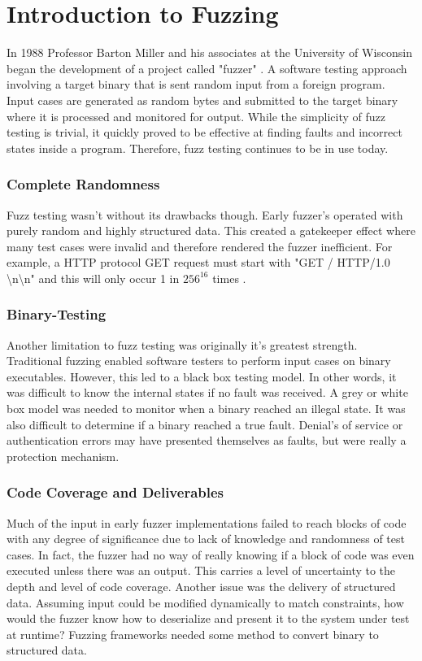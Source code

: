 \chapter{Introduction to Fuzzing}

In 1988 Professor Barton Miller and his associates at the University of Wisconsin began the development of a project called "fuzzer" \cite{mil-fuzz}. A software testing approach involving a target binary that is sent random input from a foreign program.
 Input cases are generated as random bytes and submitted to the target binary where it is processed and monitored for output. While the simplicity of fuzz testing is trivial, it quickly proved to be effective at finding faults and incorrect states inside a program. 
Therefore, fuzz testing continues to be in use today.

\subsection{Complete Randomness}
Fuzz testing wasn't without its drawbacks though. Early fuzzer's operated with purely random and highly structured data.
This created a gatekeeper effect where many test cases were invalid and therefore rendered the fuzzer inefficient. 
For example, a HTTP protocol GET request  must start with "GET / HTTP/1.0 \textbackslash n\textbackslash n" and this will only occur 1 in $256^{16}$ times \cite{mil-fuzz}. 

\subsection{Binary-Testing}
Another limitation to fuzz testing was originally it's greatest strength. Traditional fuzzing enabled software testers to perform input cases on binary executables. 
However, this led to a black box testing model. In other words, it was difficult to know the internal states if no fault was received.  A grey or white box model was needed to monitor when a binary reached an illegal state.  It was also difficult to determine
if a binary reached a true fault. Denial's of service or authentication errors may have presented themselves as faults, but were really a protection mechanism.

\subsection{Code Coverage and Deliverables}
Much of the input in early fuzzer implementations failed to reach blocks of code with any degree of significance due to lack of knowledge and randomness of test cases. In fact, the fuzzer had no way of really knowing if a block of code was even executed
unless there was an output. This carries a level of uncertainty to the depth and level of code coverage.  Another issue was the delivery of structured data. Assuming input could be modified
dynamically to match constraints, how would the fuzzer know how to deserialize and present it to the system under test at runtime? Fuzzing frameworks needed some method to convert binary to structured data.  

